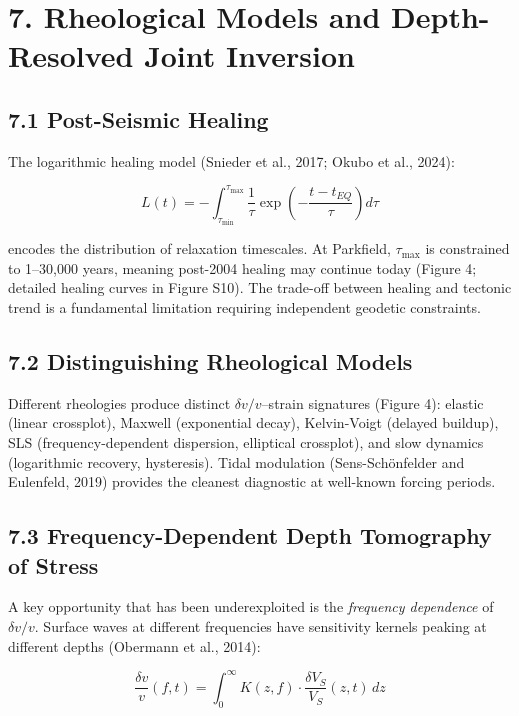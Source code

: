 \documentclass[draft]{agujournal2019}
\begin{document}
\section{7. Rheological Models and Depth-Resolved Joint
Inversion}\label{rheological-models-and-depth-resolved-joint-inversion}

\subsection{7.1 Post-Seismic Healing}\label{post-seismic-healing}

The logarithmic healing model (Snieder et al., 2017; Okubo et al.,
2024):

\[L(t) = -\int_{\tau_{\min}}^{\tau_{\max}} \frac{1}{\tau} \exp\left(-\frac{t - t_{EQ}}{\tau}\right) d\tau \tag{12}\]

encodes the distribution of relaxation timescales. At Parkfield,
\(\tau_{\max}\) is constrained to 1--30,000 years, meaning post-2004
healing may continue today (Figure 4; detailed healing curves in Figure
S10). The trade-off between healing and tectonic trend is a fundamental
limitation requiring independent geodetic constraints.

\subsection{7.2 Distinguishing Rheological
Models}\label{distinguishing-rheological-models}

Different rheologies produce distinct \(\delta v/v\)--strain signatures
(Figure 4): elastic (linear crossplot), Maxwell (exponential decay),
Kelvin-Voigt (delayed buildup), SLS (frequency-dependent dispersion,
elliptical crossplot), and slow dynamics (logarithmic recovery,
hysteresis). Tidal modulation (Sens-Schönfelder and Eulenfeld, 2019)
provides the cleanest diagnostic at well-known forcing periods.

\subsection{7.3 Frequency-Dependent Depth Tomography of
Stress}\label{frequency-dependent-depth-tomography-of-stress}

A key opportunity that has been underexploited is the \emph{frequency
dependence} of \(\delta v/v\). Surface waves at different frequencies
have sensitivity kernels peaking at different depths (Obermann et al.,
2014):

\[\frac{\delta v}{v}(f, t) = \int_0^\infty K(z, f) \cdot \frac{\delta V_S}{V_S}(z, t) \, dz \tag{13}\]
\end{document}
